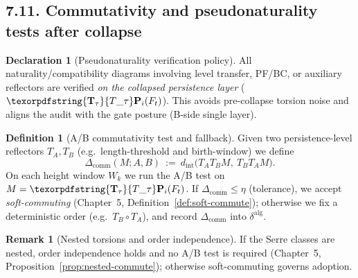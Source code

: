 \documentclass[11pt]{article}
\DeclareRobustCommand{\hyp}{\nobreakdash-}
\numberwithin{equation}{section}
\theoremstyle{definition}
\newtheorem{definition}[theorem]{Definition}
\newtheorem{remark}[theorem]{Remark}
\newtheorem{declaration}[theorem]{Declaration}
\DeclareRobustCommand{\Ttau}{\texorpdfstring{\ensuremath{\mathbf{T}_{\tau}}}{T\_\tau}}
\begin{document}
\subsection*{7.11. Commutativity and pseudonaturality tests after collapse}
\begin{declaration}[Pseudonaturality verification policy]\label{dec:pseudonat}
All naturality/compatibility diagrams involving level transfer, PF/BC, or auxiliary reflectors are verified \emph{on the collapsed persistence layer} (\(\Ttau\mathbf{P}_i(F_t)\)). This avoids pre\hyp collapse torsion noise and aligns the audit with the gate posture (B\hyp side single layer).
\end{declaration}

\begin{definition}[A/B commutativity test and fallback]\label{def:ab-test}
Given two persistence\hyp level reflectors \(T_A,T_B\) (e.g.\ length\hyp threshold and birth\hyp window) we define
\[
\Delta_{\mathrm{comm}}(M;A,B)\ :=\ d_{\mathrm{int}}\!\big(T_A T_B M,\ T_B T_A M\big).
\]
On each height window \(W_k\) we run the A/B test on \(M=\Ttau\mathbf{P}_i(F_t)\). If \(\Delta_{\mathrm{comm}}\le \eta\) (tolerance), we accept \emph{soft\hyp commuting} (Chapter~5, Definition~\ref{def:soft-commute}); otherwise we fix a deterministic order (e.g.\ \(T_B\circ T_A\)), and record \(\Delta_{\mathrm{comm}}\) into \(\delta^{\mathrm{alg}}\).
\end{definition}

\begin{remark}[Nested torsions and order independence]
If the Serre classes are nested, order independence holds and no A/B test is required (Chapter~5, Proposition~\ref{prop:nested-commute}); otherwise soft\hyp commuting governs adoption.
\end{remark}
\end{document}
